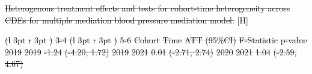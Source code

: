 \documentclass[
  letterpaper,
  DIV=11,
  numbers=noendperiod]{scrartcl}
\makeatletter
\renewenvironment{table}%
   {\renewcommand\familydefault\sfdefault
    \@float{table}}
   {\end@float}
\providecommand{\DIFdel}[1]{{\protect\color{red}\sout{#1}}}                      %
\providecommand{\DIFdelbegin}{} %
\providecommand{\DIFdelFL}[1]{\DIFdel{#1}} %
\providecommand{\DIFaddbeginFL}{} %
\providecommand{\DIFaddendFL}{} %
\providecommand{\DIFdelbeginFL}{} %
\providecommand{\DIFdelendFL}{} %
\newcommand{\DIFscaledelfig}{0.5}
\newlength{\DIFdelgraphicswidth} %
\newlength{\DIFdelgraphicsheight} %
\newcommand{\DIFaddincludegraphics}[2][]{{\color{blue}\fbox{\DIFOincludegraphics[#1]{#2}}}} %
\newcommand{\DIFdelincludegraphics}[2][]{%
\sbox{\DIFdelgraphicsbox}{\DIFOincludegraphics[#1]{#2}}%
\settoboxwidth{\DIFdelgraphicswidth}{\DIFdelgraphicsbox} %
\settoboxtotalheight{\DIFdelgraphicsheight}{\DIFdelgraphicsbox} %
\scalebox{\DIFscaledelfig}{%
\parbox[b]{\DIFdelgraphicswidth}{\usebox{\DIFdelgraphicsbox}\\[-\baselineskip] \rule{\DIFdelgraphicswidth}{0em}}\llap{\resizebox{\DIFdelgraphicswidth}{\DIFdelgraphicsheight}{%
\setlength{\unitlength}{\DIFdelgraphicswidth}%
\begin{picture}(1,1)%
\thicklines\linethickness{2pt} %
{\color[rgb]{1,0,0}\put(0,0){\framebox(1,1){}}}%
{\color[rgb]{1,0,0}\put(0,0){\line( 1,1){1}}}%
{\color[rgb]{1,0,0}\put(0,1){\line(1,-1){1}}}%
\end{picture}%
}\hspace*{3pt}}} %
} %
\DeclareRobustCommand{\DIFdelbegin}{\DIFOdelbegin \let\includegraphics\DIFdelincludegraphics} %
\DeclareRobustCommand{\DIFaddbeginFL}{\DIFOaddbeginFL \let\includegraphics\DIFaddincludegraphics} %
\DeclareRobustCommand{\DIFaddendFL}{\DIFOaddendFL \let\includegraphics\DIFOincludegraphics} %
\DeclareRobustCommand{\DIFdelbeginFL}{\DIFOdelbeginFL \let\includegraphics\DIFdelincludegraphics} %
\DeclareRobustCommand{\DIFdelendFL}{\DIFOaddendFL \let\includegraphics\DIFOincludegraphics} %
\makeatother
\begin{document}
\DIFdelbegin %
{%
\DIFdelFL{Heterogenous treatment effects and tests for cohort-time heterogeneity
across CDEs for multiple mediation blood pressure mediation model. }}%
\DIFdelendFL \DIFaddbeginFL \begin{table}[H]
\DIFaddendFL 

\DIFdelbeginFL %
\DIFdelFL{(l}%
\DIFdelFL{3pt}%
\DIFdelFL{r}%
\DIFdelFL{3pt}%
\DIFdelFL{)}%
\DIFdelFL{3-4}%
\DIFdelFL{(l}%
\DIFdelFL{3pt}%
\DIFdelFL{r}%
\DIFdelFL{3pt}%
\DIFdelFL{)}%
\DIFdelFL{5-6}%
\DIFdelFL{Cohort }%
\DIFdelFL{Time }%
\DIFdelFL{ATT }%
\DIFdelFL{(95\%CI) }%
\DIFdelFL{F-Statistic }%
\DIFdelFL{p-value}%
\DIFdelFL{\hspace{1em}2019 }%
\DIFdelFL{2019 }%
\DIFdelFL{-1.24 }%
\DIFdelFL{(-4.20, 1.72) }%
\DIFdelFL{\hspace{1em}2019 }%
\DIFdelFL{2021 }%
\DIFdelFL{0.01 }%
\DIFdelFL{(-2.71, 2.74) }%
\DIFdelFL{\hspace{1em}2020 }%
\DIFdelFL{2021 }%
\DIFdelFL{1.04 }%
\DIFdelFL{(-2.59, 4.67) }%

\end{table}
\end{document}
